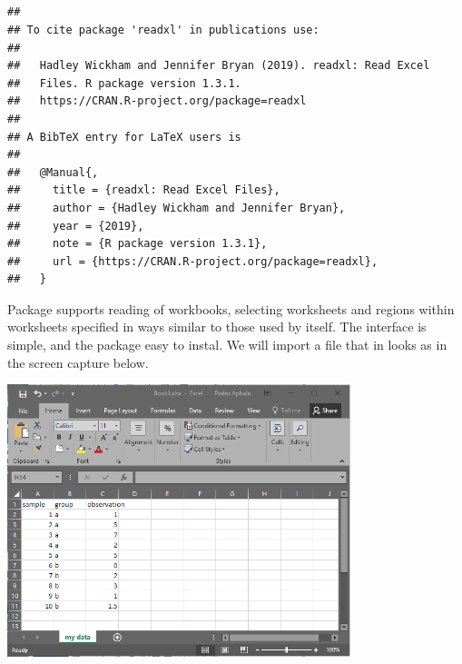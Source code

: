 \documentclass[krantz2]{krantz}\usepackage{knitr}%
\begin{document}
\subsection['readxl']{}\label{sec:files:excel}

\begin{knitrout}\footnotesize
{}\color{fgcolor}\begin{kframe}
\begin{alltt}
\hlstd{(} \hlstd{=} \hlstd{)}
\end{alltt}
\begin{verbatim}
## 
## To cite package 'readxl' in publications use:
## 
##   Hadley Wickham and Jennifer Bryan (2019). readxl: Read Excel
##   Files. R package version 1.3.1.
##   https://CRAN.R-project.org/package=readxl
## 
## A BibTeX entry for LaTeX users is
## 
##   @Manual{,
##     title = {readxl: Read Excel Files},
##     author = {Hadley Wickham and Jennifer Bryan},
##     year = {2019},
##     note = {R package version 1.3.1},
##     url = {https://CRAN.R-project.org/package=readxl},
##   }
\end{verbatim}
\end{kframe}
\end{knitrout}

Package  supports reading of  workbooks, selecting worksheets and regions within worksheets specified in ways similar to those used by  itself. The interface is simple, and the package easy to instal. We will import a file that in  looks as in the screen capture below.

\begin{center}
\includegraphics[width=0.75\textwidth]{figures/Book1-xlsx.png}
\end{center}
\end{document}
